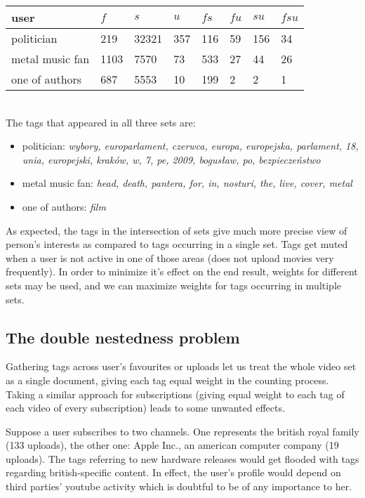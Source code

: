 \begin{tabular}{| l | l | l | l | l | l | l | l |}
user & $f$ & $s$ & $u$ & $fs$ & $fu$ & $su$ & $fsu$ \\ \hline
politician & 219 & 32321 & 357 & 116 & 59 & 156 & 34 \\
metal music fan & 1103 & 7570 & 73 & 533 & 27 & 44 & 26 \\
one of authors & 687 & 5553 & 10 & 199 & 2 & 2 & 1 \\
\end{tabular} \\

The tags that appeared in all three sets are:
\begin{itemize}
  \item{politician: \emph{wybory, europarlament, czerwca, europa, europejska,
  parlament, 18, unia, europejski, kraków, w, 7, pe, 2009, bogusław, po,
  bezpieczeństwo}}
  \item{metal music fan: \emph{head, death, pantera, for, in, nosturi, the, live, cover, metal}}
  \item{one of authors: \emph{film}}
\end{itemize}

As expected, the tags in the intersection of sets give much more precise view of person's
interests as compared to tags occurring in a single set. Tags get muted when a user is not active in one of
those areas (\eg does not upload movies very frequently). In order to minimize it's effect on the
end result, weights for different sets may be used, and we can maximize weights for tags occurring
in multiple sets.

\subsection{The double nestedness problem}
Gathering tags across user's favourites or uploads let us treat the whole video
set as a single document, giving each tag equal weight in the counting process.
Taking a similar approach for subscriptions (\eg giving equal weight to each
tag of each video of every subscription) leads to some unwanted effects.

Suppose a user subscribes to two channels. One represents the british royal
family (133 uploads), the other one: Apple Inc., an american computer company
(19 uploads). The tags referring to new hardware releases would get flooded with
tags regarding british-specific content. In effect, the user's profile would
depend on third parties' youtube activity which is doubtful to be of any
importance to her.


